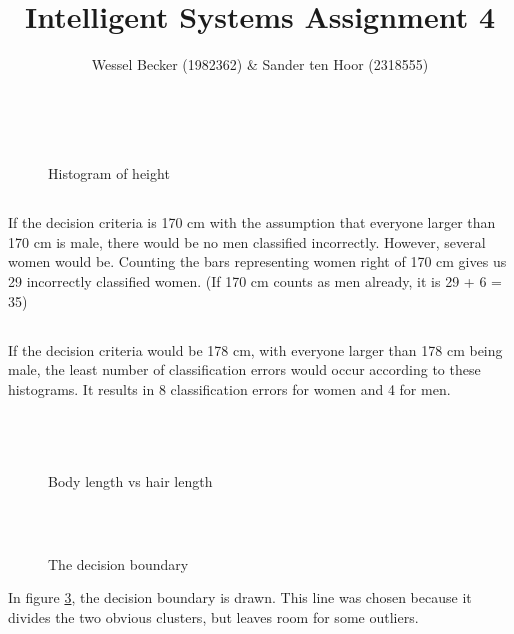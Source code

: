 \documentclass[10pt,a4paper]{article}
\begin{document}
\title{Intelligent Systems Assignment 4}
\author{Wessel Becker (1982362) \& Sander ten Hoor (2318555)}
\maketitle

\newcommand{\simplefigure}[3]{
	\begin{figure}[H]
  	\centering
    	\makebox[\textwidth]
    	{
    		\texttt{[image: \#1]}
 		} \\
  		\caption{#2}
  		\label{#3}
	\end{figure}
}

\section{}
\subsection{}
\simplefigure{./images/1_1}{Histogram of height}{fig:1_1}

\subsection{}
If the decision criteria is 170 cm with the assumption that everyone larger than 170 cm is male, there would be no men classified incorrectly. However, several women would be. Counting the bars representing women right of 170 cm gives us 29 incorrectly classified women.
(If 170 cm counts as men already, it is 29 + 6 = 35)

\subsection{}
If the decision criteria would be 178 cm, with everyone larger than 178 cm being male, the least number of classification errors would occur according to these histograms. It results in 8 classification errors for women and 4 for men.

\section{}
\subsection{}
\simplefigure{./images/2_1}{Body length vs hair length}{fig:2_1}

\subsection{}
\simplefigure{./images/2_2}{The decision boundary}{fig:2_2}
In figure \ref{fig:2_2}, the decision boundary is drawn. This line was chosen because it divides the two obvious clusters, but leaves room for some outliers.
\end{document}
